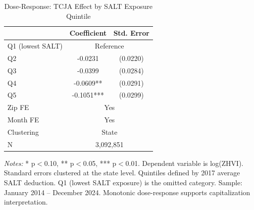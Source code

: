 \begin{table}[H]
\centering
\caption{Dose-Response: TCJA Effect by SALT Exposure Quintile}
\begin{threeparttable}
\begin{tabular}{lcc}
\toprule
 & Coefficient & Std. Error \\
\midrule
Q1 (lowest SALT) & \multicolumn{2}{c}{Reference} \\
Q2 & -0.0231 & (0.0220) \\
Q3 & -0.0399 & (0.0284) \\
Q4 & -0.0609** & (0.0291) \\
Q5 & -0.1051*** & (0.0299) \\
\midrule
Zip FE & \multicolumn{2}{c}{Yes} \\
Month FE & \multicolumn{2}{c}{Yes} \\
Clustering & \multicolumn{2}{c}{State} \\
N & \multicolumn{2}{c}{3,092,851} \\
\bottomrule
\end{tabular}
\begin{tablenotes}[flushleft]
\small
\item \textit{Notes:} * p$<$0.10, ** p$<$0.05, *** p$<$0.01. Dependent variable is log(ZHVI). Standard errors clustered at the state level. Quintiles defined by 2017 average SALT deduction. Q1 (lowest SALT exposure) is the omitted category. Sample: January 2014 -- December 2024. Monotonic dose-response supports capitalization interpretation.
\end{tablenotes}
\end{threeparttable}
\label{tab:quintile}
\end{table}

